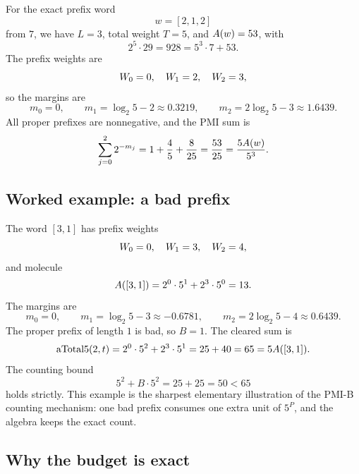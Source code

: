 For the exact prefix word
\begin{equation*}
  w=[2,1,2]
\end{equation*}
from $7$, we have $L=3$, total weight $T=5$, and
$A(w)=53$, with
\begin{equation*}
  2^5\cdot29=928=5^3\cdot7+53.
\end{equation*}
The prefix weights are
\begin{equation*}
  W_0=0,\quad W_1=2,\quad W_2=3,
\end{equation*}
so the margins are
\begin{equation*}
  m_0=0,\qquad
  m_1=\log_2 5-2\approx0.3219,\qquad
  m_2=2\log_2 5-3\approx1.6439.
\end{equation*}
All proper prefixes are nonnegative, and the PMI sum is
\begin{equation*}
  \sum_{j=0}^{2}2^{-m_j}
    =1+\frac45+\frac8{25}
    =\frac{53}{25}
    =\frac{5A(w)}{5^3}.
\end{equation*}

\subsection{Worked example: a bad prefix}

The word $[3,1]$ has prefix weights
\begin{equation*}
  W_0=0,\quad W_1=3,\quad W_2=4,
\end{equation*}
and molecule
\begin{equation*}
  A([3,1])=2^0\cdot5^1+2^3\cdot5^0=13.
\end{equation*}
The margins are
\begin{equation*}
  m_0=0,\qquad
  m_1=\log_2 5-3\approx-0.6781,\qquad
  m_2=2\log_2 5-4\approx0.6439.
\end{equation*}
The proper prefix of length $1$ is bad, so $B=1$.  The cleared sum is
\begin{equation*}
  \mathrm{aTotal5}(2,t)
    =2^0\cdot5^2+2^3\cdot5^1
    =25+40=65=5A([3,1]).
\end{equation*}
The counting bound
\begin{equation*}
  5^2+B\cdot5^2=25+25=50<65
\end{equation*}
holds strictly.  This example is the sharpest elementary illustration
of the PMI-B counting mechanism: one bad prefix consumes one extra
unit of $5^P$, and the algebra keeps the exact count.

\subsection{Why the budget is exact}

